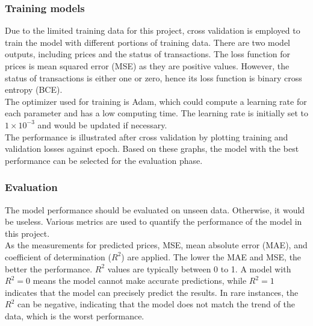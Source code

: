\documentclass[12pt,twoside]{report}
\begin{document}
\subsubsection{Training models}
Due to the limited training data for this project, cross validation is employed to train the model with different portions of training data. There are two model outputs, including prices and the status of transactions. The loss function for prices is mean squared error (MSE) as they are positive values. However, the status of transactions is either one or zero, hence its loss function is binary cross entropy (BCE). 
\\

The optimizer used for training is Adam, which could compute a learning rate for each parameter and has a low computing time. The learning rate is initially set to $1 \times 10^{-3}$ and would be updated if necessary.
\\

The performance is illustrated after cross validation by plotting training and validation losses against epoch. Based on these graphs, the model with the best performance can be selected for the evaluation phase. 

\subsubsection{Evaluation}
The model performance should be evaluated on unseen data. Otherwise, it would be useless. Various metrics are used to quantify the performance of the model in this project. 
\\

As the measurements for predicted prices, MSE, mean absolute error (MAE), and coefficient of determination ($R^2$) are applied.  The lower the MAE and MSE, the better the performance. $R^2$ values are typically between 0 to 1. A model with $R^2 = 0$ means the model cannot make accurate predictions, while $R^2 = 1$ indicates that the model can precisely predict the results. In rare instances, the $R^2$ can be negative, indicating that the model does not match the trend of the data, which is the worst performance. 
\\
\end{document}

